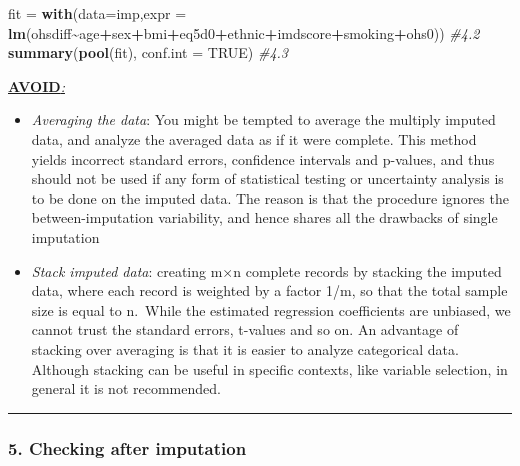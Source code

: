 \documentclass[
]{article}
\newenvironment{Shaded}{\begin{snugshade}}{\end{snugshade}}
\newcommand{\AttributeTok}[1]{\textcolor[rgb]{0.13,0.29,0.53}{#1}}
\newcommand{\CommentTok}[1]{\textcolor[rgb]{0.56,0.35,0.01}{\textit{#1}}}
\newcommand{\ConstantTok}[1]{\textcolor[rgb]{0.56,0.35,0.01}{#1}}
\newcommand{\FunctionTok}[1]{\textcolor[rgb]{0.13,0.29,0.53}{\textbf{#1}}}
\newcommand{\NormalTok}[1]{#1}
\newcommand{\OtherTok}[1]{\textcolor[rgb]{0.56,0.35,0.01}{#1}}
\newcommand{\SpecialCharTok}[1]{\textcolor[rgb]{0.81,0.36,0.00}{\textbf{#1}}}
\begin{document}
\begin{Shaded}
\begin{Highlighting}[]
\NormalTok{fit }\OtherTok{=} \FunctionTok{with}\NormalTok{(}\AttributeTok{data=}\NormalTok{imp,}\AttributeTok{expr =} \FunctionTok{lm}\NormalTok{(ohsdiff}\SpecialCharTok{\textasciitilde{}}\NormalTok{age}\SpecialCharTok{+}\NormalTok{sex}\SpecialCharTok{+}\NormalTok{bmi}\SpecialCharTok{+}\NormalTok{eq5d0}\SpecialCharTok{+}\NormalTok{ethnic}\SpecialCharTok{+}\NormalTok{imdscore}\SpecialCharTok{+}\NormalTok{smoking}\SpecialCharTok{+}\NormalTok{ohs0)) }\CommentTok{\#4.2}
\FunctionTok{summary}\NormalTok{(}\FunctionTok{pool}\NormalTok{(fit), }\AttributeTok{conf.int =} \ConstantTok{TRUE}\NormalTok{) }\CommentTok{\#4.3}
\end{Highlighting}
\end{Shaded}

\ul{\textbf{AVOID}\emph{:}}

\begin{itemize}
\item
  \emph{Averaging the data}: You might be tempted to average the
  multiply imputed data, and analyze the averaged data as if it were
  complete. This method yields incorrect standard errors, confidence
  intervals and p-values, and thus should not be used if any form of
  statistical testing or uncertainty analysis is to be done on the
  imputed data. The reason is that the procedure ignores the
  between-imputation variability, and hence shares all the drawbacks of
  single imputation
\item
  \emph{Stack imputed data}: creating m×n complete records by stacking
  the imputed data, where each record is weighted by a factor 1/m, so
  that the total sample size is equal to n.~While the estimated
  regression coefficients are unbiased, we cannot trust the standard
  errors, t-values and so on. An advantage of stacking over averaging is
  that it is easier to analyze categorical data. Although stacking can
  be useful in specific contexts, like variable selection, in general it
  is not recommended.
\end{itemize}

\begin{center}\rule{0.5\linewidth}{0.5pt}\end{center}

\hypertarget{checking-after-imputation}{%
\subsubsection{5. Checking after
imputation}\label{checking-after-imputation}}
\end{document}
